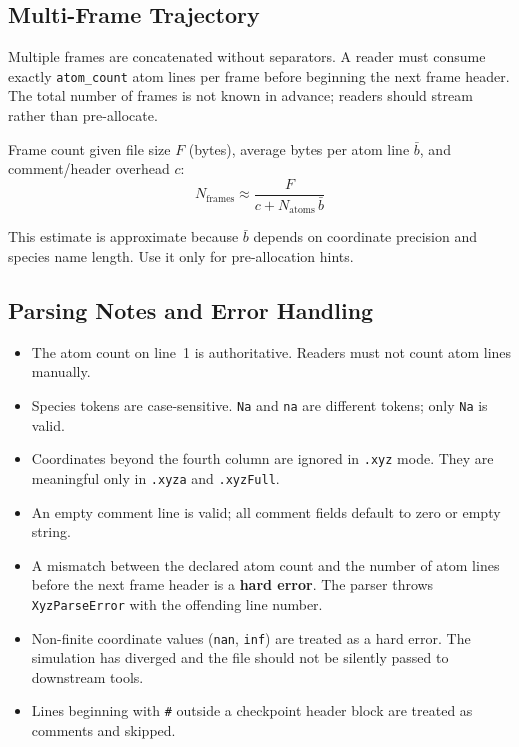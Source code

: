 \documentclass[11pt, a4paper, oneside]{article}
\begin{document}
\subsection{Multi-Frame Trajectory}
\label{sec:xyz_trajectory}

Multiple frames are concatenated without separators. A reader must
consume exactly \texttt{atom\_count} atom lines per frame before beginning
the next frame header. The total number of frames is not known in advance;
readers should stream rather than pre-allocate.

Frame count given file size $F$ (bytes), average bytes per atom line
$\bar{b}$, and comment/header overhead $c$:
\begin{equation}
  N_{\mathrm{frames}} \approx \frac{F}{c + N_{\mathrm{atoms}}\,\bar{b}}
  \label{eq:frame_count}
\end{equation}

This estimate is approximate because $\bar{b}$ depends on coordinate
precision and species name length. Use it only for pre-allocation hints.

\subsection{Parsing Notes and Error Handling}
\label{sec:xyz_parsing}

\begin{itemize}
  \item The atom count on line~1 is authoritative. Readers must not count
    atom lines manually.
  \item Species tokens are case-sensitive. \texttt{Na} and \texttt{na} are
    different tokens; only \texttt{Na} is valid.
  \item Coordinates beyond the fourth column are ignored in \texttt{.xyz}
    mode. They are meaningful only in \texttt{.xyza} and \texttt{.xyzFull}.
  \item An empty comment line is valid; all comment fields default to
    zero or empty string.
  \item A mismatch between the declared atom count and the number of
    atom lines before the next frame header is a \textbf{hard error}.
    The parser throws \texttt{XyzParseError} with the offending line number.
  \item Non-finite coordinate values (\texttt{nan}, \texttt{inf}) are
    treated as a hard error. The simulation has diverged and the file
    should not be silently passed to downstream tools.
  \item Lines beginning with \texttt{\#} outside a checkpoint header block
    are treated as comments and skipped.
\end{itemize}
\end{document}
